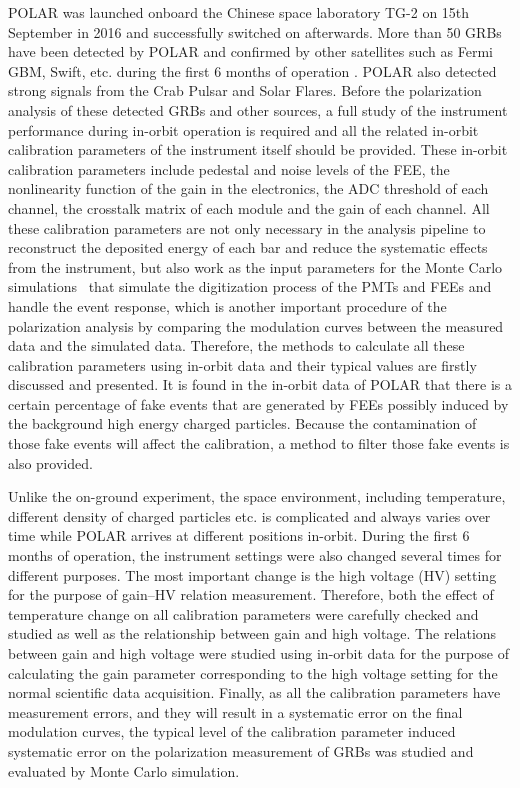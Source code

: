 \documentclass[preprint,sort&compress,12pt]{elsarticle}
\begin{document}
POLAR was launched onboard the Chinese space laboratory TG-2 on 15th September in 2016 and successfully switched on afterwards. More than 50 GRBs have been detected by POLAR and confirmed by other satellites such as Fermi GBM, Swift, etc. during the first 6 months of operation \cite{Xiong2017}. POLAR also detected strong signals from the Crab Pulsar \cite{Hancheng2017} and Solar Flares. Before the polarization analysis of these detected GRBs and other sources, a full study of the instrument performance during in-orbit operation is required and all the related in-orbit calibration parameters of the instrument itself should be provided. These in-orbit calibration parameters include pedestal and noise levels of the FEE, the nonlinearity function of the gain in the electronics, the ADC threshold of each channel, the crosstalk matrix of each module and the gain of each channel. All these calibration parameters are not only necessary in the analysis pipeline to reconstruct the deposited energy of each bar and reduce the systematic effects from the instrument, but also work as the input parameters for the Monte Carlo simulations~\cite{Kole2017} that simulate the digitization process of the PMTs and FEEs and handle the event response, which is another important procedure of the polarization analysis by comparing the modulation curves between the measured data and the simulated data. Therefore, the methods to calculate all these calibration parameters using in-orbit data and their typical values are firstly discussed and presented. It is found in the in-orbit data of POLAR that there is a certain percentage of fake events that are generated by FEEs possibly induced by the background high energy charged particles. Because the contamination of those fake events will affect the calibration, a method to filter those fake events is also provided.

Unlike the on-ground experiment, the space environment, including temperature, different density of charged particles etc. is complicated and always varies over time while POLAR arrives at different positions in-orbit. During the first 6 months of operation, the instrument settings were also changed several times for different purposes. The most important change is the high voltage (HV) setting for the purpose of gain--HV relation measurement. Therefore, both the effect of temperature change on all calibration parameters were carefully checked and studied as well as the relationship between gain and high voltage. The relations between gain and high voltage were studied using in-orbit data for the purpose of calculating the gain parameter corresponding to the high voltage setting for the normal scientific data acquisition. Finally, as all the calibration parameters have measurement errors, and they will result in a systematic error on the final modulation curves, the typical level of the calibration parameter induced systematic error on the polarization measurement of GRBs was studied and evaluated by Monte Carlo simulation.
\end{document}
